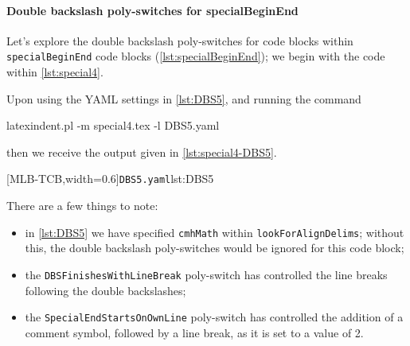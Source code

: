  \paragraph{Double backslash poly-switches for specialBeginEnd}
  \begin{example}
  Let's explore the double backslash poly-switches for code blocks within
  \texttt{specialBeginEnd} code blocks (\vref{lst:specialBeginEnd}); we begin with the
  code within \cref{lst:special4}.     


  Upon using the YAML settings in \cref{lst:DBS5}, and running the command
   

  \begin{commandshell}
latexindent.pl -m special4.tex -l DBS5.yaml
\end{commandshell}

  then we receive the output given in \cref{lst:special4-DBS5}. 

  \begin{cmhtcbraster}[
    raster force size=false,
    raster column 1/.style={add to width=-.1\textwidth},
    raster column skip=.06\linewidth]
   [MLB-TCB,width=0.6\textwidth]{\texttt{DBS5.yaml}}{lst:DBS5}
  \end{cmhtcbraster}

  There are a few things to note:
  \begin{itemize}
   \item in \cref{lst:DBS5} we have specified \texttt{cmhMath} within
         \texttt{lookForAlignDelims}; without this, the double backslash poly-switches
         would be ignored for this code block;
   \item the \texttt{DBSFinishesWithLineBreak} poly-switch has controlled the line breaks
         following the double backslashes;
   \item the \texttt{SpecialEndStartsOnOwnLine} poly-switch has controlled the addition
         of a comment symbol, followed by a line break, as it is set to a value of 2.
  \end{itemize}
  \end{example}

